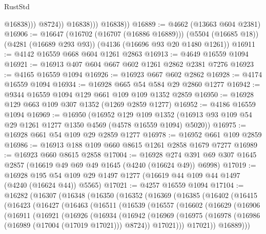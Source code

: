 \begin{lexlean}{RustStd}
\begin{coremodule}
                        @16838)))
                  @8724))
              @16838)))
        @16838))
@16889 := @4662 (@13663 @604 @2381)
@16906 := @16647
    (@16702 (@16707 (@16886 @16889)))
    (@5504 (@16685 @18))
    (@4281 (@16689 @293 @93))
    (@4136 (@16696 @93 @20 @1480 @1261))
@16911 := @4142 @16559 @668 @604 @1261 @2863
@16913 := @4649 @16559 @1094
@16921 := @16913 @407 @604 @667 @602 @1261 @2862 @2381 @7276
@16923 := @4165 @16559 @1094
@16926 := @16923 @667 @602 @2862
@16928 := @4174 @16559 @1094
@16934 := @16928 @665 @54 @584 @29 @2860 @1277
@16942 := @9344 @16559 @1094 @129 @661 @109 @109 @1352 @2859
@16950 := @16928 @129 @663 @109 @307 @1352 (@1269 @2859 @1277)
@16952 := @4186 @16559 @1094
@16969 := @16950
    (@16952
      @129
      @109
      @1352
      (@16913 @93 @109 @54 @29 @1261 @1277 @1350 @4569 (@4578 @16559 @1094) @5020))
@16975 := @16928 @661 @54 @109 @29 @2859 @1277
@16978 := @16952 @661 @109 @2859
@16986 := @16913 @188 @109 @660 @8615 @1261 @2858 @1679 @7277
@16989 := @16923 @660 @8615 @2858
@17004 := @16928
    @274
    @391
    @69
    @307
    @1645
    @2857
    (@16619 @49 @69 @49 @1645 (@4240 (@16624 @49)) @6998)
@17019 := @16928
    @195
    @54
    @109
    @29
    @1497
    @1277
    (@16619 @44 @109 @44 @1497 (@4240 (@16624 @44)) @5565)
@17021 := @4257 @16559 @1094
@17104 := @16282
    (@16307
      (@16348
        (@16350
          (@16352
            (@16369
              (@16385
                (@16402
                  (@16415
                    (@16423
                      (@16427
                        (@16463
                          (@16511
                            (@16539
                              (@16557
                                (@16602
                                  (@16629
                                    (@16906
                                      (@16911
                                        (@16921
                                          (@16926
                                            (@16934
                                              (@16942
                                                (@16969
                                                  (@16975
                                                    (@16978
                                                      (@16986
                                                        (@16989 (@17004 (@17019 @17021)))
                                                        @8724))
                                                    @17021)))
                                              @17021))
                                          @16889)))

\end{coremodule}
\end{lexlean}

